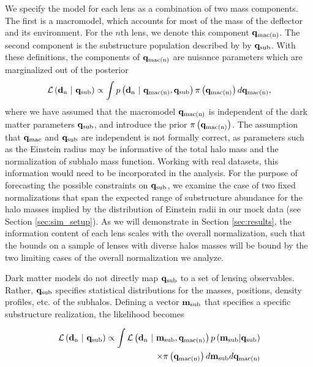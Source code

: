 We specify the model for each lens as a combination of two mass components. The first is a macromodel, which accounts for most of the mass of the deflector and its environment. For the $n$th lens, we denote this component ${\bf{q}_{\rm{mac(n)}}}$. The second component is the substructure population described by by ${\bf{q}_{\rm{sub}}}$. With these definitions, the components of ${\bf{q}_{\rm{mac(n)}}}$ are nuisance parameters which are marginalized out of the posterior
\begin{equation}
{\mathcal{L}}\left({\bf{d}_{\rm{n}}} \ | \ {\bf{q}_{\rm{sub}}} \right) \propto \int p\left({\bf{d}_{\rm{n}}} \ | \ {\bf{q}_{\rm{mac(n)}}},{\bf{q}_{\rm{sub}}} \right) \pi\left({\bf{q}_{\rm{mac(n)}}}\right) d {\bf{q}_{\rm{mac(n)}}},
\end{equation}
where we have assumed that the macromodel ${\bf{q}_{\rm{mac(n)}}}$ is independent of the dark matter parameters ${\bf{q}_{\rm{sub}}}$, and introduce the prior $\pi\left({\bf{q}_{\rm{mac(n)}}}\right)$. The assumption that ${\bf{q}_{\rm{mac}}}$ and ${\bf{q}_{\rm{sub}}}$ are independent is not formally correct, as parameters such as the Einstein radius may be informative of the total halo mass and the normalization of subhalo mass function. Working with real datasets, this information would need to be incorporated in the analysis. For the purpose of forecasting the possible constraints on ${\bf{q}_{\rm{sub}}}$, we examine the case of two fixed normalizations that span the expected range of substructure abundance for the halo masses implied by the distribution of Einstein radii in our mock data (see Section \ref{sec:sim_setup}). As we will demonstrate in Section \ref{sec:results}, the information content of each lens scales with the overall normalization, such that the bounds on a sample of lenses with diverse halos masses will be bound by the two limiting cases of the overall normalization we analyze.

Dark matter models do not directly map ${\bf{q}_{\rm{sub}}}$ to a set of lensing observables. Rather, ${\bf{q}_{\rm{sub}}}$ specifies statistical distributions for the masses, positions, density profiles, etc. of the subhalos. Defining a vector ${\bf{m}_{\rm{sub}}}$ that specifies a specific substructure realization, the likelihood becomes 

\begin{eqnarray}
\label{eqn:marginal_like}
\nonumber {\mathcal{L}}\left({\bf{d}_{\rm{n}}} \ | \ {\bf{q}_{\rm{sub}}} \right) \propto \int {\mathcal{L}}\left({\bf{d}_{\rm{n}}} \ | \ {\bf{m}_{\rm{sub}}}, {\bf{q}_{\rm{mac(n)}}} \right) p\left({\bf{m}_{\rm{sub}}} | {\bf{q}_{\rm{sub}}}\right) \\ \times \pi\left({\bf{q}_{\rm{mac(n)}}}\right) d {\bf{m}_{\rm{sub}}} d {\bf{q}_{\rm{mac(n)}}}
\end{eqnarray}

